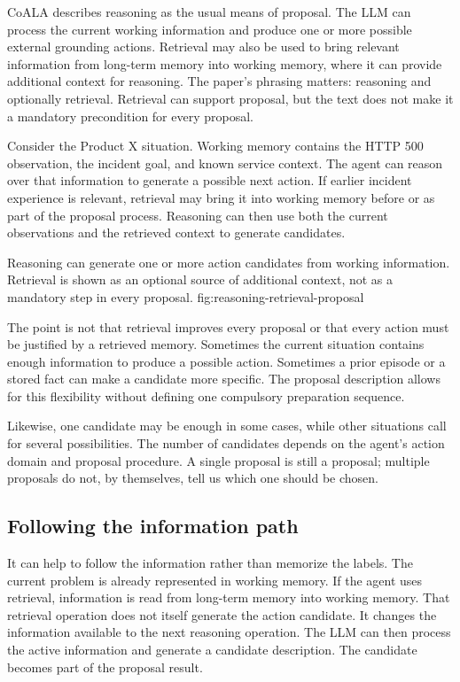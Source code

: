 CoALA describes reasoning as the usual means of proposal. The LLM can process the current working information and produce one or more possible external grounding actions. Retrieval may also be used to bring relevant information from long-term memory into working memory, where it can provide additional context for reasoning. The paper's phrasing matters: reasoning and optionally retrieval. Retrieval can support proposal, but the text does not make it a mandatory precondition for every proposal.

Consider the Product X situation. Working memory contains the HTTP 500 observation, the incident goal, and known service context. The agent can reason over that information to generate a possible next action. If earlier incident experience is relevant, retrieval may bring it into working memory before or as part of the proposal process. Reasoning can then use both the current observations and the retrieved context to generate candidates.

  {Reasoning can generate one or more action candidates from working information. Retrieval is shown as an optional source of additional context, not as a mandatory step in every proposal.}
  {fig:reasoning-retrieval-proposal}

The point is not that retrieval improves every proposal or that every action must be justified by a retrieved memory. Sometimes the current situation contains enough information to produce a possible action. Sometimes a prior episode or a stored fact can make a candidate more specific. The proposal description allows for this flexibility without defining one compulsory preparation sequence.

Likewise, one candidate may be enough in some cases, while other situations call for several possibilities. The number of candidates depends on the agent's action domain and proposal procedure. A single proposal is still a proposal; multiple proposals do not, by themselves, tell us which one should be chosen.

\subsection{Following the information path}

It can help to follow the information rather than memorize the labels. The current problem is already represented in working memory. If the agent uses retrieval, information is read from long-term memory into working memory. That retrieval operation does not itself generate the action candidate. It changes the information available to the next reasoning operation. The LLM can then process the active information and generate a candidate description. The candidate becomes part of the proposal result.

